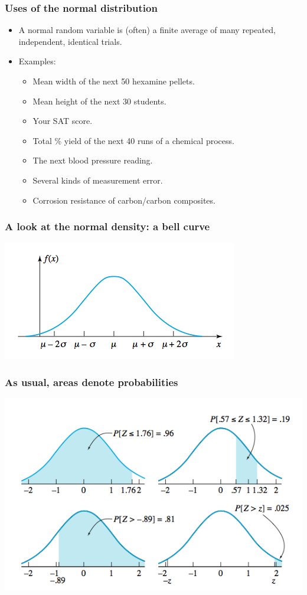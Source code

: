 \documentclass[handout]{beamer}\usepackage[]{graphicx}\usepackage[]{color}
\numberwithin{equation}{section}
\begin{document}
\begin{frame}
\frametitle{Uses of the normal distribution}
\begin{itemize}
\item A normal random variable is (often) a finite average of many repeated, independent, identical trials.
\pause \item Examples:
\begin{itemize}
\pause \item Mean width of the next 50 hexamine pellets.
\pause \item Mean height of the next 30 students.
\pause \item Your SAT score.
\pause \item Total \% yield of the next 40 runs of a chemical process.
\pause \item The next blood pressure reading.
\pause \item Several kinds of measurement error.
\pause \item Corrosion resistance of carbon/carbon composites.
\end{itemize}
\end{itemize}
\end{frame}

\begin{frame}
\frametitle{A look at the normal density: a bell curve}
 \includegraphics{../../fig/np1.png}
\end{frame}

\begin{frame}
\frametitle{As usual, areas denote probabilities}
 \includegraphics{../../fig/np2.png}
\end{frame}
\end{document}
